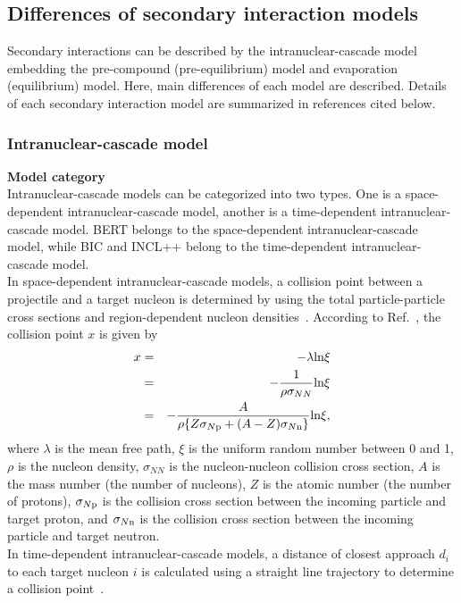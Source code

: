 \clearpage





\subsection{Differences of secondary interaction models}
\vs\hs
Secondary interactions can be described by the intranuclear-cascade model embedding the pre-compound (pre-equilibrium) model and evaporation (equilibrium) model.
Here, main differences of each model are described.
Details of each secondary interaction model are summarized in references cited below.

\subsubsection{Intranuclear-cascade model}
\vs
\textbf{Model category}\\
\hs
Intranuclear-cascade models can be categorized into two types.
One is a space-dependent intranuclear-cascade model, another is a time-dependent intranuclear-cascade model.
BERT belongs to the space-dependent intranuclear-cascade model, while BIC and INCL++ belong to the time-dependent intranuclear-cascade model.\\
\hs
In space-dependent intranuclear-cascade models, a collision point between a projectile and a target nucleon is determined by using the total particle-particle cross sections and region-dependent nucleon densities~\cite{Geant4}.
According to Ref.~\cite{2017KobraPhD}, the collision point $x$ is given by
\begin{eqnarray}
	x &=& -\lambda{\rm ln}\xi \nonumber \\
	  &=& -{1 \over \rho\sigma_{NN}}{\rm ln}\xi \nonumber \\
	  &=& -{A \over \rho\{Z\sigma_{N{\rm p}} + (A - Z)\sigma_{N{\rm n}}\}}{\rm ln}\xi,
\end{eqnarray}
where $\lambda$ is the mean free path, $\xi$ is the uniform random number between 0 and 1, $\rho$ is the nucleon density, $\sigma_{NN}$ is the nucleon-nucleon collision cross section, $A$ is the mass number (the number of nucleons), $Z$ is the atomic number (the number of protons), $\sigma_{N{\rm p}}$ is the collision cross section between the incoming particle and target proton, and $\sigma_{N{\rm n}}$ is the collision cross section between the incoming particle and target neutron.\\
\hs
In time-dependent intranuclear-cascade models, a distance of closest approach $d_{i}$ to each target nucleon $i$ is calculated using a straight line trajectory to determine a collision point~\cite{Geant4}.
